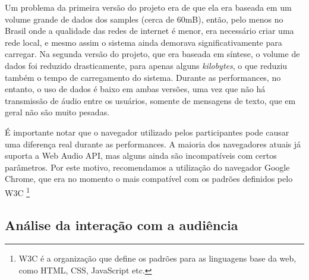 
Um problema da primeira versão do projeto era de que ela era baseada em um volume grande de dados dos samples (cerca de 60mB), então, pelo menos no Brasil onde a qualidade das redes de internet é menor, era necessário criar uma rede local, e mesmo assim o sistema ainda demorava significativamente para carregar. Na segunda versão do projeto, que era baseada em síntese, o volume de dados foi reduzido drasticamente, para apenas alguns \emph{kilobytes}, o que reduziu também o tempo de carregamento do sistema. Durante as performances, no entanto, o uso de dados é baixo em ambas versões, uma vez que não há transmissão de áudio entre os usuários, somente de mensagens de texto, que em geral não são muito pesadas. 


É importante notar que o navegador utilizado pelos participantes pode causar uma diferença real durante as performances. A maioria dos navegadores atuais já suporta a Web Audio API, mas alguns ainda são incompatíveis com certos parâmetros. Por este motivo, recomendamos a utilização do navegador Google Chrome, que era no momento o mais compatível com os padrões definidos pelo W3C \footnote{W3C é a organização que define os padrões para as linguagens base da web, como HTML, CSS, JavaScript etc.}


%


\subsection{Análise da interação com a audiência}


